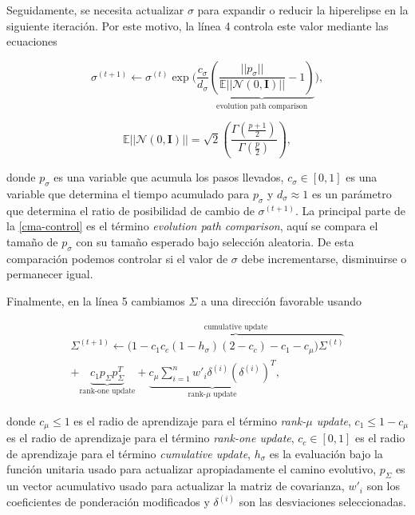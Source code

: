 Seguidamente, se necesita actualizar $\sigma$ para expandir o reducir la
hiperelipse en la siguiente iteración. Por este motivo, la línea 4 controla
este valor mediante las ecuaciones

\begin{equation}
    \sigma^{(t + 1)} \gets \sigma^{(t)} \exp\bigg(\frac{c_{\sigma}}{d_{\sigma}}
    \underbrace{\left(\frac{||p_{\sigma}||}{\mathbb{E}||\mathcal{N}(0,
    \mathbf{I})||} - 1 \right)}_{\text{evolution path comparison}} \bigg),
\label{cma-control}
\end{equation}

\begin{equation}
\mathbb{E}||\mathcal{N}(0, \mathbf{I})|| = \sqrt{2} \left(
  \frac{\Gamma\left(\frac{p + 1}{2}\right)}{\Gamma\left({\frac{p}{2}}\right)}
  \right),
\label{cma-E}
\end{equation}

donde $p_{\sigma}$ es una variable que acumula los pasos llevados,
$c_{\sigma} \in [0, 1]$ es una variable que determina el tiempo acumulado para $p_{\sigma}$ y 
$d_{\sigma} \approx 1$ es un parámetro que determina el ratio de posibilidad de cambio de $\sigma^{(t + 1)}$. 
La principal parte de la \autoref{cma-control} es el término \emph{evolution path comparison}, 
aquí se compara el tamaño de $p_{\sigma}$ con su tamaño esperado bajo selección
aleatoria.
De esta comparación podemos controlar si el valor de $\sigma$ debe
incrementarse, disminuirse o permanecer igual.

Finalmente, en la línea 5 cambiamos $\Sigma$ a una dirección favorable usando

\begin{multline}
    \Sigma^{(t + 1)} \gets \overbrace{\bigg(1 - c_1 c_c (1 - h_{\sigma})(2 - c_c) - c_1 - c_{\mu}\bigg) \Sigma^{(t)}}^{\text{cumulative update}} \\
    + \underbrace{c_{1} p_{\Sigma} p_{\Sigma}^{T}}_{\text{rank-one update}}
    + \underbrace{c_{\mu}\sum_{i=1}^{n}w'_{i}
    \delta^{(i)}\left(\delta^{(i)}\right)^{T}}_{\text{rank-}\mu\text{ update}},
\label{cma-adapt}
\end{multline}

donde $c_{\mu} \leq 1$ es el radio de aprendizaje para el término \emph{rank-$\mu$ update}, 
$c_1 \leq 1 - c_{\mu}$ es el radio de aprendizaje para el término \emph{rank-one update}, 
$c_c \in [0, 1]$ es el radio de aprendizaje para el término \emph{cumulative update}, 
$h_{\sigma}$ es la evaluación bajo la función unitaria usado para actualizar
apropiadamente el camino evolutivo, 
$p_{\Sigma}$ es un vector acumulativo usado para actualizar la matriz de
covarianza, 
$w'_i$ son los coeficientes de ponderación modificados y
$\delta^{(i)}$ son las desviaciones seleccionadas.

